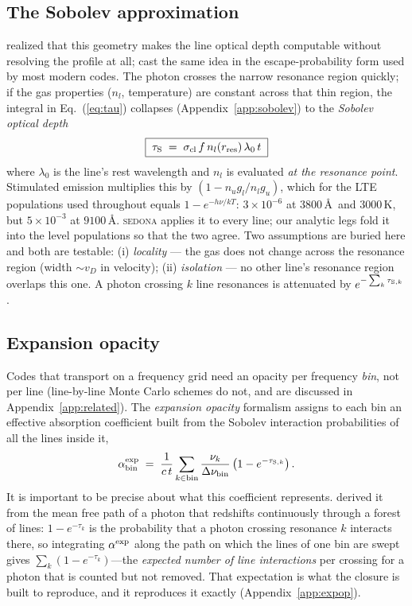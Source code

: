 \documentclass[fleqn,usenatbib]{mnras}
\newcommand{\taus}{\tau_{\mathrm{S}}}
\begin{document}
\subsection{The Sobolev approximation}

\citet{sobolev1960} realized that this geometry makes the line optical depth
computable without resolving the profile at all; \citet{castor1970} cast the
same idea in the escape-probability form used by most modern codes. The photon crosses the
narrow resonance region quickly; if the gas properties ($n_l$, temperature)
are constant across that thin region, the integral in Eq.~(\ref{eq:tau})
collapses (Appendix~\ref{app:sobolev}) to the \emph{Sobolev optical depth}
\begin{equation}
  \boxed{\;
  \taus \;=\; \sigma_{\rm cl}\, f\, n_l(r_{\rm res})\, \lambda_0\, t
  \;}
  \label{eq:tausob}
\end{equation}
where $\lambda_0$ is the line's rest wavelength and $n_l$ is evaluated
\emph{at the resonance point}. Stimulated emission multiplies this by
$(1-n_u g_l/n_l g_u)$, which for the LTE populations used throughout equals
$1-e^{-h\nu/kT}$: $3\times10^{-6}$ at $3800$\,\AA\ and $3000$\,K, but
$5\times10^{-3}$ at $9100$\,\AA. \textsc{sedona} applies it to every line;
our analytic legs fold it into the level populations so that the two agree.
Two assumptions are buried here and both are testable: (i) \emph{locality} --- the gas does not change across the
resonance region (width $\sim v_D$ in velocity); (ii) \emph{isolation} ---
no other line's resonance region overlaps this one. A photon crossing $k$
line resonances is attenuated by $e^{-\sum_k \tau_{{\rm S},k}}$.

\subsection{Expansion opacity}
\label{sec:primer-expop}

Codes that transport on a frequency grid need an opacity per frequency
\emph{bin}, not per line (line-by-line Monte Carlo schemes do not, and are
discussed in Appendix~\ref{app:related}). The \emph{expansion opacity}
formalism \citep{karp1977,eastman1993} assigns to each bin an effective
absorption coefficient built from the Sobolev interaction probabilities of
all the lines inside it,
\begin{equation}
  \alpha^{\rm exp}_{\rm bin}
  \;=\;
  \frac{1}{c\,t}\sum_{k \in \rm bin} \frac{\nu_k}{\Delta\nu_{\rm bin}}
  \left(1 - e^{-\tau_{{\rm S},k}}\right).
  \label{eq:expop}
\end{equation}
It is important to be precise about what this coefficient represents.
\citet{karp1977} derived it from the mean free path of a photon that
redshifts continuously through a forest of lines: $1-e^{-\tau_k}$ is the
probability that a photon crossing resonance $k$ interacts there, so
integrating $\alpha^{\rm exp}$ along the path on which the lines of one bin
are swept gives $\sum_k(1-e^{-\tau_k})$---the \emph{expected number of line
interactions} per crossing for a photon that is counted but not removed. That
expectation is what the closure is built to reproduce, and it reproduces it
exactly (Appendix~\ref{app:expop}).
\end{document}
